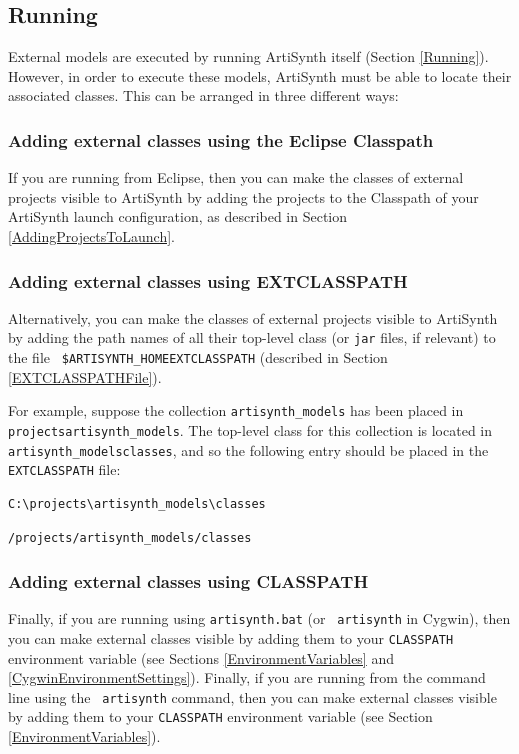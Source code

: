 \subsection{Running}

External models are executed by running ArtiSynth itself (Section
\ref{Running}). However, in order to execute these models, ArtiSynth
must be able to locate their associated classes. This can be
arranged in three different ways:

\subsubsection{Adding external classes using the Eclipse Classpath}

If you are running from Eclipse, then you can make the classes of
external projects visible to ArtiSynth by adding the projects to the
{\sf Classpath} of your ArtiSynth launch configuration, as described
in Section \ref{AddingProjectsToLaunch}.

\subsubsection{Adding external classes using EXTCLASSPATH}

Alternatively, you can make the classes of external projects visible
to ArtiSynth by adding the path names of all their top-level class
\directories (or {\tt jar} files, if relevant) to the file {\tt
\$ARTISYNTH\_HOME\SEP EXTCLASSPATH} (described in Section
\ref{EXTCLASSPATHFile}).

For example, suppose the collection {\tt artisynth\_models}
has been placed in {\tt \TOP projects\SEP artisynth\_models}.
The top-level class \directory for this collection is located
in {\tt artisynth\_models\SEP classes}, and so the following entry
should be placed in the {\tt EXTCLASSPATH} file:

\ifWindows
\begin{verbatim}
C:\projects\artisynth_models\classes
\end{verbatim}
\else
\begin{verbatim}
/projects/artisynth_models/classes
\end{verbatim}
\fi

\subsubsection{Adding external classes using CLASSPATH}

\ifWindows
Finally, if you are running using {\tt artisynth.bat} (or {\tt
artisynth} in Cygwin), then you can make external classes visible by
adding them to your {\tt CLASSPATH} environment variable (see Sections
\ref{EnvironmentVariables} and \ref{CygwinEnvironmentSettings}).
\else
Finally, if you are running from the command line using the {\tt
artisynth} command, then you can make external classes visible by adding
them to your {\tt CLASSPATH} environment variable (see Section
\ref{EnvironmentVariables}).
\fi

